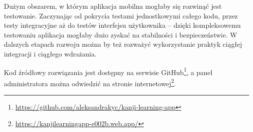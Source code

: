 \documentclass[a4paper,twoside,12pt]{book}
\begin{document}
Dużym obszarem, w którym aplikacja mobilna mogłaby się rozwinąć jest testowanie. Zaczynając od pokrycia testami jednostkowymi całego kodu, przez testy integracyjne aż do testów interfejsu użytkownika -- dzięki kompleksowemu testowaniu aplikacja mogłaby dużo zyskać na stabilności i bezpieczeństwie. W dalszych etapach rozwoju można by też rozważyć wykorzystanie praktyk ciągłej integracji i ciągłego wdrażania.

Kod źródłowy rozwiązania jest dostępny na serwisie GitHub\footnote{\url{https://github.com/aleksandrakyc/kanji-learning-app}}, a panel administratora można odwiedzić na stronie internetowej\footnote{\url{https://kanjilearningapp-e002b.web.app/}}.
\backmatter

\printbibliography           %
\end{document}
